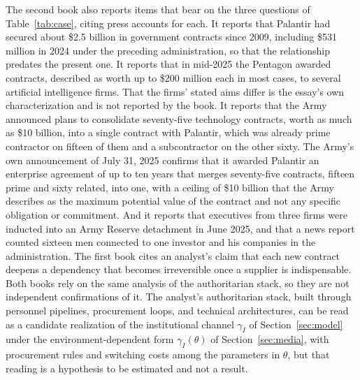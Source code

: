 \documentclass[12pt]{article}
\theoremstyle{remark}
\begin{document}
The second book also reports items that bear on the three questions of Table~\ref{tab:case}, citing press accounts for each. It reports that Palantir had secured about \$2.5 billion in government contracts since 2009, including \$531 million in 2024 under the preceding administration, so that the relationship predates the present one. It reports that in mid-2025 the Pentagon awarded contracts, described as worth up to \$200 million each in most cases, to several artificial intelligence firms. That the firms' stated aims differ is the essay's own characterization and is not reported by the book. It reports that the Army announced plans to consolidate seventy-five technology contracts, worth as much as \$10 billion, into a single contract with Palantir, which was already prime contractor on fifteen of them and a subcontractor on the other sixty. The Army's own announcement of July 31, 2025 \cite{army2025} confirms that it awarded Palantir an enterprise agreement of up to ten years that merges seventy-five contracts, fifteen prime and sixty related, into one, with a ceiling of \$10 billion that the Army describes as the maximum potential value of the contract and not any specific obligation or commitment. And it reports that executives from three firms were inducted into an Army Reserve detachment in June 2025, and that a news report counted sixteen men connected to one investor and his companies in the administration. The first book cites an analyst's claim that each new contract deepens a dependency that becomes irreversible once a supplier is indispensable. Both books rely on the same analysis of the authoritarian stack, so they are not independent confirmations of it. The analyst's authoritarian stack, built through personnel pipelines, procurement loops, and technical architectures, can be read as a candidate realization of the institutional channel $\gamma_I$ of Section~\ref{sec:model} under the environment-dependent form $\gamma_I(\theta)$ of Section~\ref{sec:media}, with procurement rules and switching costs among the parameters in $\theta$, but that reading is a hypothesis to be estimated and not a result.
\end{document}
